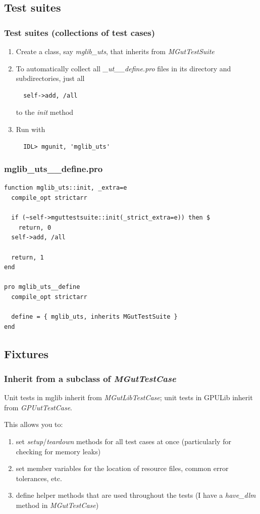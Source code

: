 \documentclass[12pt, handout]{beamer}
\begin{document}
\subsection{Test suites}

\begin{frame}[t, fragile]
  \hypertarget{suites}{}
  \frametitle{Test suites (collections of test cases)}
  \begin{enumerate}
    \item Create a class, say {\em mglib\_uts}, that inherits from {\em MGutTestSuite}
    \item To automatically collect all {\em \_ut\_\_define.pro} files in its directory and subdirectories, just all
\begin{lstlisting}
  self->add, /all
\end{lstlisting}
to the {\em init} method
    \item Run with
\begin{lstlisting}
  IDL> mgunit, 'mglib_uts'
\end{lstlisting}
  \end{enumerate}
\end{frame}

\begin{frame}[fragile]
  \frametitle{mglib\_uts\_\_define.pro}
\begin{lstlisting}[basicstyle=\ttfamily\fontsize{10pt}{10pt}\selectfont]
function mglib_uts::init, _extra=e
  compile_opt strictarr

  if (~self->mguttestsuite::init(_strict_extra=e)) then $
    return, 0
  self->add, /all

  return, 1
end

pro mglib_uts__define
  compile_opt strictarr

  define = { mglib_uts, inherits MGutTestSuite }
end
\end{lstlisting}
\end{frame}

\subsection{Fixtures}

\begin{frame}
  \frametitle{Inherit from a subclass of {\em MGutTestCase}}
Unit tests in mglib inherit from {\em MGutLibTestCase}; unit tests in GPULib inherit from {\em GPUutTestCase}.

This allows you to:
\begin{enumerate}
  \item set {\em setup}/{\em teardown} methods for all test cases at once (particularly for checking for memory leaks)
  \item set member variables for the location of resource files, common error tolerances, etc.
  \item define helper methods that are used throughout the tests (I have a {\em have\_dlm} method in {\em MGutTestCase})
\end{enumerate}
\end{frame}
\end{document}
